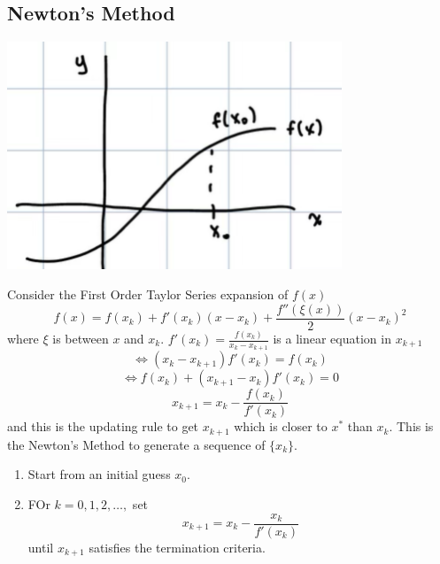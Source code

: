 \documentclass[12pt]{scrartcl}
\begin{document}
\subsection{Newton's Method}

\begin{note}
  
  \hfill

  \begin{center}
    \includegraphics[width=10cm]{newtons.png}
  \end{center}
\end{note}

\begin{definition}
  Consider the First Order Taylor Series expansion of $f(x)$ 
  \[f(x) = f(x_k) + f'(x_k)(x-x_k) + \frac{f''(\xi(x))}{2}(x-x_k)^2\]
  where $\xi$ is between $x$ and $x_k$. 
  $f'(x_k) = \frac{f(x_k)}{x_k - x_{k+1}}$ is a linear equation in $x_{k+1}$
  \[\Leftrightarrow (x_k - x_{k+1})f'(x_k) = f(x_k)\]
  \[\Leftrightarrow f(x_k) + (x_{k+1} - x_k)f'(x_k) = 0\]
  \[x_{k+1} = x_k - \frac{f(x_k)}{f'(x_k)}\]
  and this is the updating rule to get $x_{k+1}$ which is closer to $x^*$ than $x_k$. 
  This is the Newton's Method to generate a sequence of $\{x_k\}$. 
\end{definition}

\begin{definition}
  \hfill

  \begin{enumerate}
    \item Start from an initial guess $x_0$.
    \item FOr $k = 0, 1, 2, \ldots,$ set 
    \[x_{k+1} = x_k - \frac{x_k}{f'(x_k)}\]
    until $x_{k+1}$ satisfies the termination criteria.
  \end{enumerate}
\end{definition}
\end{document}

